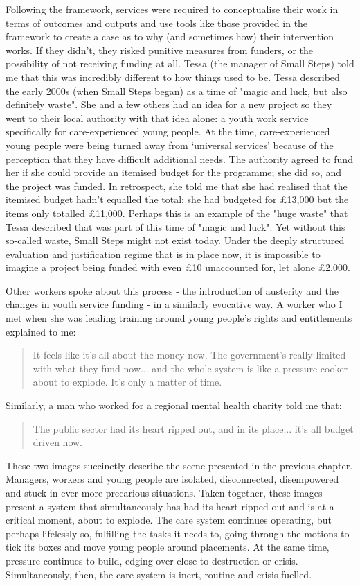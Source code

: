 Following the framework, services were required to conceptualise their work in terms of outcomes and outputs and use tools like those provided in the framework to create a case as to why (and sometimes how) their intervention works. If they didn't, they risked punitive measures from funders, or the possibility of not receiving funding at all. Tessa (the manager of Small Steps) told me that this was incredibly different to how things used to be. Tessa described the early 2000s (when Small Steps began) as a time of "magic and luck, but also definitely waste". She and a few others had an idea for a new project so they went to their local authority with that idea alone: a youth work service specifically for care-experienced young people. At the time, care-experienced young people were being turned away from `universal services' because of the perception that they have difficult additional needs. The authority agreed to fund her if she could provide an itemised budget for the programme; she did so, and the project was funded. In retrospect, she told me that she had realised that the itemised budget hadn't equalled the total: she had budgeted for £13,000 but the items only totalled £11,000. Perhaps this is an example of the "huge waste" that Tessa described that was part of this time of "magic and luck". Yet without this so-called waste, Small Steps might not exist today. Under the deeply structured evaluation and justification regime that is in place now, it is impossible to imagine a project being funded with even £10 unaccounted for, let alone £2,000.

Other workers spoke about this process - the introduction of austerity and the changes in youth service funding - in a similarly evocative way. A worker who I met when she was leading training around young people's rights and entitlements explained to me:
\begin{quote}
It feels like it's all about the money now. The government's really limited with what they fund now... and the whole system is like a pressure cooker about to explode. It's only a matter of time.
\end{quote}
Similarly, a man who worked for a regional mental health charity told me that:
\begin{quote}
The public sector had its heart ripped out, and in its place... it's all budget driven now.
\end{quote}
These two images succinctly describe the scene presented in the previous chapter. Managers, workers and young people are isolated, disconnected, disempowered and stuck in ever-more-precarious situations. Taken together, these images present a system that simultaneously has had its heart ripped out and is at a critical moment, about to explode. The care system continues operating, but perhaps lifelessly so, fulfilling the tasks it needs to, going through the motions to tick its boxes and move young people around placements. At the same time, pressure continues to build, edging over close to destruction or crisis. Simultaneously, then, the care system is inert, routine and crisis-fuelled. 


